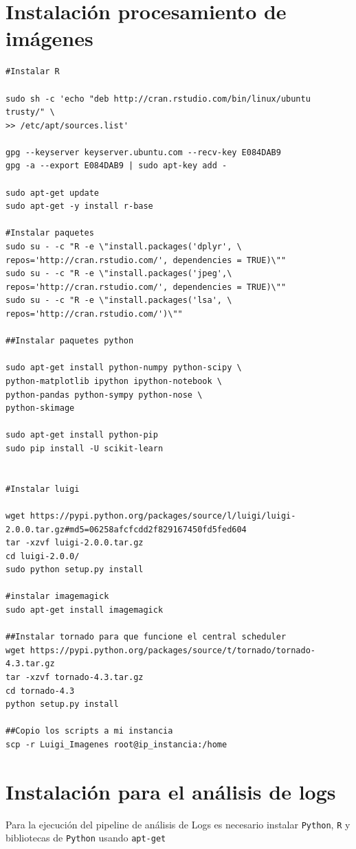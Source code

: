\section{Instalación procesamiento de imágenes}

\begin{lstlisting}
#Instalar R

sudo sh -c 'echo "deb http://cran.rstudio.com/bin/linux/ubuntu trusty/" \
>> /etc/apt/sources.list'

gpg --keyserver keyserver.ubuntu.com --recv-key E084DAB9
gpg -a --export E084DAB9 | sudo apt-key add -

sudo apt-get update
sudo apt-get -y install r-base

#Instalar paquetes
sudo su - -c "R -e \"install.packages('dplyr', \
repos='http://cran.rstudio.com/', dependencies = TRUE)\""
sudo su - -c "R -e \"install.packages('jpeg',\
repos='http://cran.rstudio.com/', dependencies = TRUE)\""
sudo su - -c "R -e \"install.packages('lsa', \
repos='http://cran.rstudio.com/')\""

##Instalar paquetes python

sudo apt-get install python-numpy python-scipy \
python-matplotlib ipython ipython-notebook \
python-pandas python-sympy python-nose \
python-skimage

sudo apt-get install python-pip
sudo pip install -U scikit-learn


#Instalar luigi

wget https://pypi.python.org/packages/source/l/luigi/luigi-2.0.0.tar.gz#md5=06258afcfcdd2f829167450fd5fed604
tar -xzvf luigi-2.0.0.tar.gz
cd luigi-2.0.0/
sudo python setup.py install

#instalar imagemagick
sudo apt-get install imagemagick

##Instalar tornado para que funcione el central scheduler
wget https://pypi.python.org/packages/source/t/tornado/tornado-4.3.tar.gz
tar -xzvf tornado-4.3.tar.gz
cd tornado-4.3
python setup.py install

##Copio los scripts a mi instancia
scp -r Luigi_Imagenes root@ip_instancia:/home
\end{lstlisting}

\section{Instalación para el análisis de logs}

Para la ejecución del pipeline de análisis de Logs es necesario instalar \texttt{Python}, \texttt{R} y bibliotecas de \texttt{Python} usando \texttt{apt-get}


